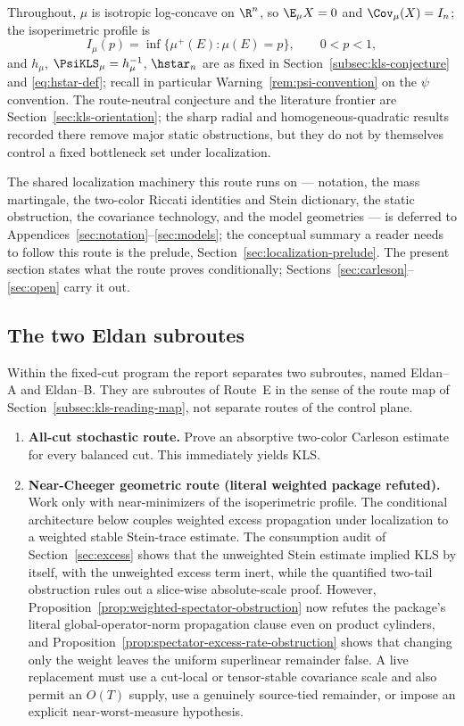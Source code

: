 \documentclass[../../main.tex]{subfiles}
\begin{document}
Throughout, $\mu$ is isotropic log-concave on $\R^n$, so $\E_\mu X=0$ and $\Cov_\mu(X)=I_n$; the
isoperimetric profile is
\[
  I_\mu(p)=\inf\{\mu^+(E):\mu(E)=p\},\qquad 0<p<1,
\]
and $h_\mu$, $\PsiKLS_\mu=h_\mu^{-1}$, $\hstar_n$ are as fixed in
Section~\ref{subsec:kls-conjecture} and \eqref{eq:hstar-def}; recall in particular
Warning~\ref{rem:psi-convention} on the $\psi$ convention. The route-neutral conjecture and the
literature frontier are Section~\ref{sec:kls-orientation}; the sharp radial and
homogeneous-quadratic results recorded there remove major static obstructions, but they do not by
themselves control a fixed bottleneck set under localization.

The shared localization machinery this route runs on --- notation, the mass martingale, the
two-color Riccati identities and Stein dictionary, the static obstruction, the covariance
technology, and the model geometries --- is deferred to
Appendices~\ref{sec:notation}--\ref{sec:models}; the conceptual summary a reader needs to follow
this route is the prelude, Section~\ref{sec:localization-prelude}. The present section states what the route proves
conditionally; Sections~\ref{sec:carleson}--\ref{sec:open} carry it out.

\subsection{The two Eldan subroutes}
\label{subsec:two-subroutes}

Within the fixed-cut program the report separates two subroutes, named Eldan--A and Eldan--B.
They are subroutes of Route~E in the sense of the route map of
Section~\ref{subsec:kls-reading-map}, not separate routes of the control plane.

\begin{enumerate}[label=\textbf{Eldan--\Alph*.},leftmargin=2.8em]
  \item \textbf{All-cut stochastic route.}  Prove an absorptive two-color Carleson estimate for
  every balanced cut. This immediately yields KLS.

  \item \textbf{Near-Cheeger geometric route (literal weighted package refuted).}  Work only with
  near-minimizers of the isoperimetric profile. The conditional architecture below couples
  weighted excess propagation under localization to a weighted stable Stein-trace estimate.
  The consumption audit of Section~\ref{sec:excess} shows that the unweighted Stein estimate
  implied KLS by itself, with the unweighted excess term inert, while the quantified two-tail
  obstruction rules out a slice-wise absolute-scale proof. However,
  Proposition~\ref{prop:weighted-spectator-obstruction} now refutes the package's literal
  global-operator-norm propagation clause even on product cylinders, and
  Proposition~\ref{prop:spectator-excess-rate-obstruction} shows that changing only the weight
  leaves the uniform superlinear remainder false. A live replacement must use a cut-local or
  tensor-stable covariance scale and also permit an $O(T)$ supply, use a genuinely source-tied
  remainder, or impose an explicit near-worst-measure hypothesis.
\end{enumerate}
\end{document}
